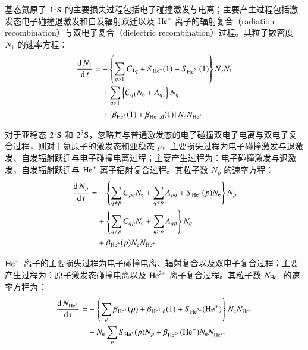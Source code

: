 基态氦原子 $1^1{\rm S}$ 的主要损失过程包括电子碰撞激发与电离；主要产生过程包括激发态电子碰撞退激发和自发辐射跃迁以及 ${\rm He}^+$ 离子的辐射复合（radiation recombination）与双电子复合（dielectric recombination）过程。其粒子数密度 $N_1$ 的速率方程：
\begin{equation}
    \label{eq:crm:gs}
    \begin{aligned}
        \frac{{\rm d}\,N_1}{{\rm d}\,t}=
        &-\left\{\sum_{q>1}C_{1q}+S_{{\rm He}^+}(1)+S_{{\rm He}^{2+}}(1)\right\}N_{\rm e}N_1\\
        &+\sum_{q>1}\left\{C_{q1}N_{\rm e}+A_{q1}\right\}N_q\\
        &+\left\{\beta_{{\rm He}^+}(1)+\beta_{{\rm He}^+,\rm d}(1)\right\}N_{\rm e}N_{{\rm He}^+}
    \end{aligned}
\end{equation}

对于亚稳态 $2^1{\rm S}$ 和 $2^3{\rm S}$，忽略其与普通激发态的电子碰撞双电子电离与双电子复合过程，则对于氦原子的激发态和亚稳态 $p$，主要损失过程为电子碰撞激发与退激发、自发辐射跃迁与电子碰撞电离过程；主要产生过程为：电子碰撞激发与退激发，自发辐射跃迁与 ${\rm He}^+$ 离子辐射复合过程。其粒子数 $N_p$ 的速率方程：
\begin{equation}
\label{eq:crm:excstate}
\begin{aligned}
\frac{{\rm d}\,N_p}{{\rm d}\,t}=
&-\left\{\sum_{q\ne p}C_{pq}N_{\rm e}+\sum_{q<p}A_{pq}+S_{{\rm He}^+}(p)N_{\rm e}\right\}N_p\\
&+\left\{\sum_{q\ne p}C_{qp}N_{\rm e}+\sum_{q>p}A_{qp}\right\}N_q\\
&+\beta_{{\rm He}^+}(p)N_{\rm e}N_{{\rm He}^+}
\end{aligned}
\end{equation}

${\rm He}^+$~离子的主要损失过程为电子碰撞电离、辐射复合以及双电子复合过程；主要产生过程为：原子激发态碰撞电离以及 ${\rm He}^{2+}$ 离子复合过程。其粒子数 $N_{{\rm He}^+}$ 的速率方程为：
\begin{equation}
\label{eq:crm:HeII}
\begin{aligned}
\frac{{\rm d}\,N_{{\rm He}^+}}{{\rm d}\,t}=
&-\left\{\sum_{p}\beta_{{\rm He}^+}(p)+\beta_{{\rm He}^+,{\rm d}}(1)+S_{{\rm He}^{2+}}({\rm He}^+)\right\}N_{\rm e}N_{{\rm He}^+}\\
&+N_{\rm e}\sum_{p}S_{{\rm He}^+}(p)N_p+\beta_{{\rm He}^{2+}}({\rm He}^{+})N_{\rm e}N_{{\rm He}^{2+}}
\end{aligned}
\end{equation}

